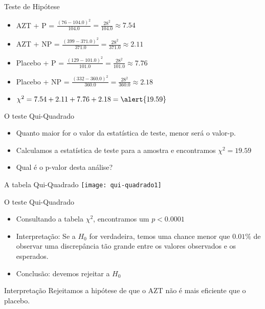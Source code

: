 \documentclass{beamer}
\begin{document}
\begin{frame}{Teste de Hipótese}
  \begin{example}
    \begin{itemize}
    \item AZT + P = $\frac{(76 - 104.0)^2}{104.0} = \frac{28^2}{104.0}
      \approx 7.54$
    \item AZT + NP = $\frac{(399 - 371.0)^2}{371.0} =
      \frac{28^2}{371.0} \approx 2.11$
    \item Placebo + P = $\frac{(129 - 101.0)^2}{101.0} =
      \frac{28^2}{101.0} \approx 7.76$
    \item Placebo + NP = $\frac{(332 - 360.0)^2}{360.0} =
      \frac{28^2}{360.0} \approx 2.18$
    \item $\chi^2 = 7.54 + 2.11 + 7.76 + 2.18 = \alert{19.59}$
    \end{itemize}
  \end{example}
\end{frame}

\begin{frame}{O teste Qui-Quadrado}
  \begin{itemize}
  \item Quanto \alert{maior} for o valor da estatística de teste,
    \alert{menor} será o valor-p.
  \item Calculamos a estatística de teste para a amostra e encontramos
    $\chi^2 = 19.59$
  \item Qual é o p-valor desta análise?
  \end{itemize}
\end{frame}

\begin{frame}{A tabela Qui-Quadrado}
\texttt{[image: qui-quadrado1]}
\end{frame}

\begin{frame}{O teste Qui-Quadrado}
  \begin{itemize}
  \item Consultando a tabela $\chi^2$, encontramos um $p<0.0001$
  \item Interpretação: Se a $H_0$ for verdadeira, temos uma
    chance menor que $0.01\%$ de observar uma discrepância tão grande
    entre os valores observados e os esperados.
  \item Conclusão: devemos \alert{rejeitar} a $H_0$
  \end{itemize}
  \begin{block}{Interpretação}
    Rejeitamos a hipótese de que o AZT não é mais eficiente que o
    placebo.
  \end{block}
\end{frame}
\end{document}
